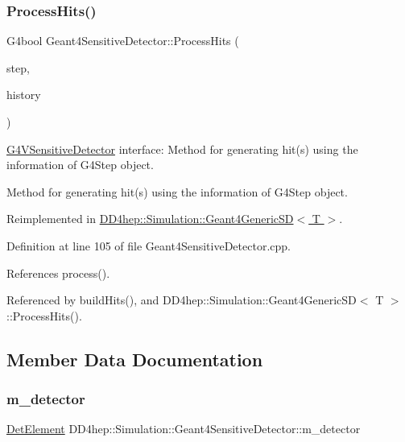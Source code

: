 \subsubsection{\texorpdfstring{Process\+Hits()}{ProcessHits()}}
{\footnotesize\ttfamily G4bool Geant4\+Sensitive\+Detector\+::\+Process\+Hits (\begin{DoxyParamCaption}\item[{G4\+Step $\ast$}]{step,  }\item[{G4\+Touchable\+History $\ast$}]{history }\end{DoxyParamCaption})\hspace{0.3cm}{\ttfamily [virtual]}}



\hyperlink{class_g4_v_sensitive_detector}{G4\+V\+Sensitive\+Detector} interface\+: Method for generating hit(s) using the information of G4\+Step object. 

Method for generating hit(s) using the information of G4\+Step object. 

Reimplemented in \hyperlink{class_d_d4hep_1_1_simulation_1_1_geant4_generic_s_d_aecea47598186c697197f51c683f13bbb}{D\+D4hep\+::\+Simulation\+::\+Geant4\+Generic\+S\+D$<$ T $>$}.



Definition at line 105 of file Geant4\+Sensitive\+Detector.\+cpp.



References process().



Referenced by build\+Hits(), and D\+D4hep\+::\+Simulation\+::\+Geant4\+Generic\+S\+D$<$ T $>$\+::\+Process\+Hits().



\subsection{Member Data Documentation}
\hypertarget{class_d_d4hep_1_1_simulation_1_1_geant4_sensitive_detector_a0483eb9c4a7e8d31c499239867b53ff1}{}\label{class_d_d4hep_1_1_simulation_1_1_geant4_sensitive_detector_a0483eb9c4a7e8d31c499239867b53ff1} 
\subsubsection{\texorpdfstring{m\+\_\+detector}{m\_detector}}
{\footnotesize\ttfamily \hyperlink{class_d_d4hep_1_1_geometry_1_1_det_element}{Det\+Element} D\+D4hep\+::\+Simulation\+::\+Geant4\+Sensitive\+Detector\+::m\+\_\+detector\hspace{0.3cm}{\ttfamily [protected]}}



